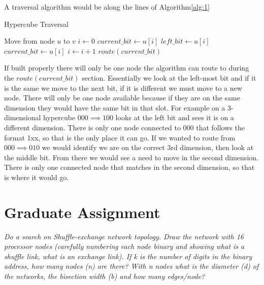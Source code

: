 \documentclass{article}
\begin{document}
\noindent A traversal algorithm would be along the lines of Algorithm\ref{alg:1}\\
\begin{algorithm}[H]
\caption{Hypercube Traversal}
\label{alg:1}
\Statex Move from node $u$ to $v$
\State $i\gets 0$
\State $current\_bit\gets u[i]$
\State $left\_bit\gets u[i]$
    \State $current\_bit\gets u[i]$
        \State $i\gets i+1$
    \Else
        \State $route(current\_bit)$ 
    \EndIf
\EndWhile
\end{algorithm}

If built properly there will only be one node the algorithm can route to during the $route(current\_bit)$ section. Essentially we look at the left-most bit and if it is the same we move to the next bit, if it is different we must move to a new node. There will only be one node available because if they are on the same dimension they would have the same bit in that slot. For example on a 3-dimensional hypercube $000 \implies 100$ looks at the left bit and sees it is on a different dimension. There is only one node connected to 000 that follows the format 1xx, so that is the only place it can go. If we wanted to route from $000 \implies 010$ we would identify we are on the correct 3rd dimension, then look at the middle bit. From there we would see a need to move in the second dimension. There is only one connected node that matches in the second dimension, so that is where it would go.


\newpage
\section{Graduate Assignment}
\textit{Do a search on Shuffle-exchange network topology.  
Draw the network with 16 processor nodes (carefully numbering each node binary and showing what is a shuffle link, what is an exchange link).  If k is the number of digits in the binary address, how many nodes (n) are there?  With n nodes what is the diameter (d) of the networks, the bisection width (b) and how many edges/node?}\\

\end{document}
